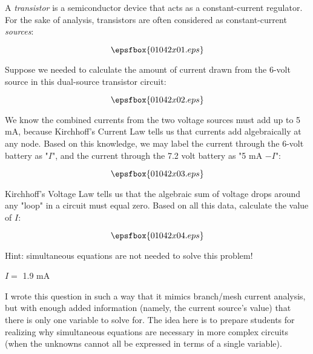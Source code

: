 

A {\it transistor} is a semiconductor device that acts as a constant-current regulator.  For the sake of analysis, transistors are often considered as constant-current {\it sources}:

$$\epsfbox{01042x01.eps}$$

Suppose we needed to calculate the amount of current drawn from the 6-volt source in this dual-source transistor circuit:

$$\epsfbox{01042x02.eps}$$

We know the combined currents from the two voltage sources must add up to 5 mA, because Kirchhoff's Current Law tells us that currents add algebraically at any node.  Based on this knowledge, we may label the current through the 6-volt battery as "$I$", and the current through the 7.2 volt battery as "5 mA $- I$":

$$\epsfbox{01042x03.eps}$$

Kirchhoff's Voltage Law tells us that the algebraic sum of voltage drops around any "loop" in a circuit must equal zero.  Based on all this data, calculate the value of $I$:

$$\epsfbox{01042x04.eps}$$

Hint: simultaneous equations are not needed to solve this problem!







$I =$ 1.9 mA







I wrote this question in such a way that it mimics branch/mesh current analysis, but with enough added information (namely, the current source's value) that there is only one variable to solve for.  The idea here is to prepare students for realizing why simultaneous equations are necessary in more complex circuits (when the unknowns cannot all be expressed in terms of a single variable).




